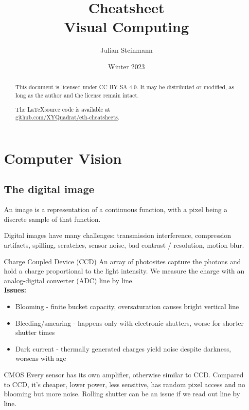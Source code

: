 \documentclass[a4paper,10pt]{article}
\title{Cheatsheet\\ Visual Computing}
\author{Julian Steinmann}
\date{\vspace{-10pt}Winter 2023}
\begin{document}
\maketitle

\renewcommand{\abstractname}{License}
\begin{abstract}
	This document is licensed under CC BY-SA 4.0. It may be distributed or modified, as long as the author and the license remain intact.

	\begin{center}
		The \LaTeX source code is available at \\ \href{https://github.com/XYQuadrat/eth-cheatsheets}{github.com/XYQuadrat/eth-cheatsheets}.
	\end{center}
\end{abstract}

\section{Computer Vision}
\subsection{The digital image}
An image is a representation of a continuous function, with a pixel being a discrete sample of that function.

Digital images have many challenges: transmission interference, compression artifacts, spilling, scratches, sensor noise, bad contrast / resolution, motion blur.

\begin{subbox}{Charge Coupled Device (CCD)}
    An array of photosites capture the photons and hold a charge proportional to the light intensity.
    We measure the charge with an analog-digital converter (ADC) line by line. \\
    \textbf{Issues:}
    \begin{itemize}
        \item Blooming - finite bucket capacity, oversaturation causes bright vertical line
        \item Bleeding/smearing - happens only with electronic shutters, worse for shorter shutter times
        \item Dark current - thermally generated charges yield noise despite darkness, worsens with age
    \end{itemize}
\end{subbox}

\begin{subbox}{CMOS}
    Every sensor has its own amplifier, otherwise similar to CCD.
    Compared to CCD, it's cheaper, lower power, less sensitive, has random pixel access and no blooming but more noise.
    Rolling shutter can be an issue if we read out line by line.
\end{subbox}
\end{document}
